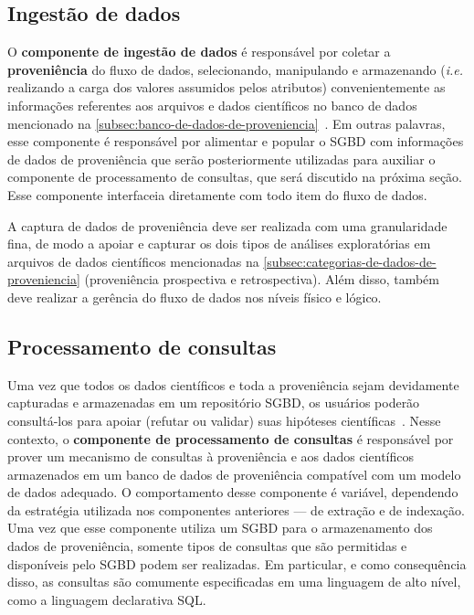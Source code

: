 \subsection{Ingestão de dados}%
\label{subsec:ingestao-de-dados}

O \textbf{componente de ingestão de dados} é responsável por coletar a \textbf{proveniência} do fluxo de dados, selecionando, manipulando e armazenando (\textit{i.e.} realizando a carga dos valores assumidos pelos atributos) convenientemente as informações referentes aos arquivos e dados científicos no banco de dados mencionado na \autoref{subsec:banco-de-dados-de-proveniencia}~\cite{silva2015propostadoutorado}. Em outras palavras, esse componente é responsável por alimentar e popular o SGBD com informações de dados de proveniência que serão posteriormente utilizadas para auxiliar o componente de processamento de consultas, que será discutido na próxima seção. Esse componente interfaceia diretamente com todo item do fluxo de dados.

A captura de dados de proveniência deve ser realizada com uma granularidade fina, de modo a apoiar e capturar os dois tipos de análises exploratórias em arquivos de dados científicos mencionadas na \autoref{subsec:categorias-de-dados-de-proveniencia} (proveniência prospectiva e retrospectiva). Além disso, também deve realizar a gerência do fluxo de dados nos níveis físico e lógico.

\subsection{Processamento de consultas}

Uma vez que todos os dados científicos e toda a proveniência sejam devidamente capturadas e armazenadas em um repositório SGBD, os usuários poderão consultá-los para apoiar (refutar ou validar) suas hipóteses científicas~\cite{silva2015propostadoutorado}. Nesse contexto, o \textbf{componente de processamento de consultas} é responsável por prover um mecanismo de consultas à proveniência e aos dados científicos armazenados em um banco de dados de proveniência compatível com um modelo de dados adequado. O comportamento desse componente é variável, dependendo da estratégia utilizada nos componentes anteriores --- de extração e de indexação. Uma vez que esse componente utiliza um SGBD para o armazenamento dos dados de proveniência, somente tipos de consultas que são permitidas e disponíveis pelo SGBD podem ser realizadas. Em particular, e como consequência disso, as consultas são comumente especificadas em uma linguagem de alto nível, como a linguagem declarativa SQL.

